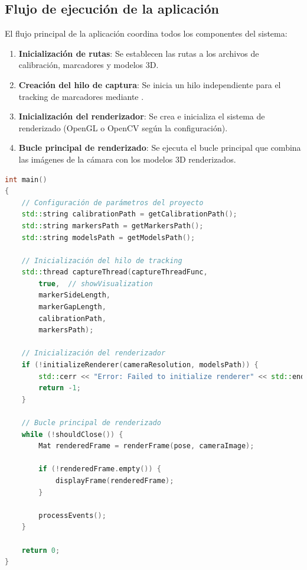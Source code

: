 \subsection{Flujo de ejecución de la aplicación}

El flujo principal de la aplicación coordina todos los componentes del sistema:

\begin{enumerate}
    \item \textbf{Inicialización de rutas}: Se establecen las rutas a los archivos de calibración, marcadores y modelos 3D.
    \item \textbf{Creación del hilo de captura}: Se inicia un hilo independiente para el \gls{tracking} de marcadores mediante .
    \item \textbf{Inicialización del renderizador}: Se crea e inicializa el sistema de renderizado (OpenGL o OpenCV según la configuración).
    \item \textbf{Bucle principal de renderizado}: Se ejecuta el bucle principal que combina las imágenes de la cámara con los modelos 3D renderizados.
\end{enumerate}

\begin{lstlisting}[language=C++]
int main()
{
    // Configuración de parámetros del proyecto
    std::string calibrationPath = getCalibrationPath();
    std::string markersPath = getMarkersPath();
    std::string modelsPath = getModelsPath();
    
    // Inicialización del hilo de tracking
    std::thread captureThread(captureThreadFunc, 
        true,  // showVisualization
        markerSideLength, 
        markerGapLength,
        calibrationPath,
        markersPath);
    
    // Inicialización del renderizador
    if (!initializeRenderer(cameraResolution, modelsPath)) {
        std::cerr << "Error: Failed to initialize renderer" << std::endl;
        return -1;
    }
    
    // Bucle principal de renderizado
    while (!shouldClose()) {
        Mat renderedFrame = renderFrame(pose, cameraImage);
        
        if (!renderedFrame.empty()) {
            displayFrame(renderedFrame);
        }
        
        processEvents();
    }
    
    return 0;
}
\end{lstlisting}

